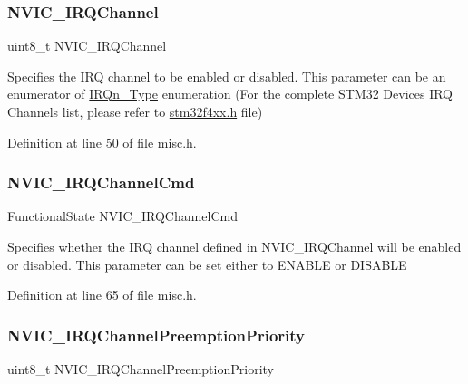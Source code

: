 \subsubsection{\texorpdfstring{N\+V\+I\+C\+\_\+\+I\+R\+Q\+Channel}{NVIC\_IRQChannel}}
{\footnotesize\ttfamily uint8\+\_\+t N\+V\+I\+C\+\_\+\+I\+R\+Q\+Channel}

Specifies the I\+RQ channel to be enabled or disabled. This parameter can be an enumerator of \hyperlink{group___configuration__section__for___c_m_s_i_s_gac3af4a32370fb28c4ade8bf2add80251}{I\+R\+Qn\+\_\+\+Type} enumeration (For the complete S\+T\+M32 Devices I\+RQ Channels list, please refer to \hyperlink{stm32f4xx_8h}{stm32f4xx.\+h} file) 

Definition at line 50 of file misc.\+h.

\mbox{\label{struct_n_v_i_c___init_type_def_a3c5567ef024a0489884083c88f17b4d5}} 
\subsubsection{\texorpdfstring{N\+V\+I\+C\+\_\+\+I\+R\+Q\+Channel\+Cmd}{NVIC\_IRQChannelCmd}}
{\footnotesize\ttfamily Functional\+State N\+V\+I\+C\+\_\+\+I\+R\+Q\+Channel\+Cmd}

Specifies whether the I\+RQ channel defined in N\+V\+I\+C\+\_\+\+I\+R\+Q\+Channel will be enabled or disabled. This parameter can be set either to E\+N\+A\+B\+LE or D\+I\+S\+A\+B\+LE 

Definition at line 65 of file misc.\+h.

\mbox{\label{struct_n_v_i_c___init_type_def_aa395d7151e569272cbcf04420a1a4128}} 
\subsubsection{\texorpdfstring{N\+V\+I\+C\+\_\+\+I\+R\+Q\+Channel\+Preemption\+Priority}{NVIC\_IRQChannelPreemptionPriority}}
{\footnotesize\ttfamily uint8\+\_\+t N\+V\+I\+C\+\_\+\+I\+R\+Q\+Channel\+Preemption\+Priority}

